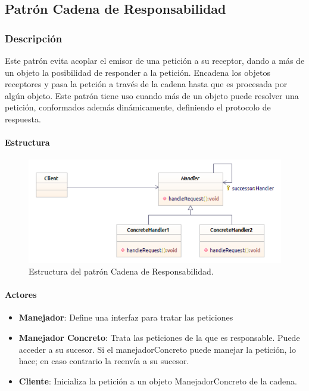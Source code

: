 \subsection{Patrón Cadena de Responsabilidad}

\subsubsection{Descripción}
Este patrón evita acoplar el emisor de una petición a su receptor, dando a más de un objeto la posibilidad de responder a la petición. Encadena los objetos receptores y pasa la petción a través de la cadena hasta que es procesada por algún objeto.
Este patrón tiene uso cuando más de un objeto puede resolver una petición, conformados además dinámicamente, definiendo el protocolo de respuesta.

\paragraph{Estructura}

\begin{figure}[th!]
	\centering
	\includegraphics[width=.7\linewidth]{imagenes/Patrones/Cadena.pdf}
	\caption{Estructura del patrón Cadena de Responsabilidad.\cite{gof}}	
\end{figure}

\paragraph{Actores}

\begin{itemize}
	\item \textbf{Manejador}: Define una interfaz para tratar las peticiones
	\item \textbf{Manejador Concreto}: Trata las peticiones de la que es responsable. Puede acceder a su sucesor. Si el manejadorConcreto puede manejar la petición, lo hace; en caso contrario la reenvía a su sucesor.
	\item \textbf{Cliente}: Inicializa la petición a un objeto ManejadorConcreto  de la cadena.
\end{itemize}


